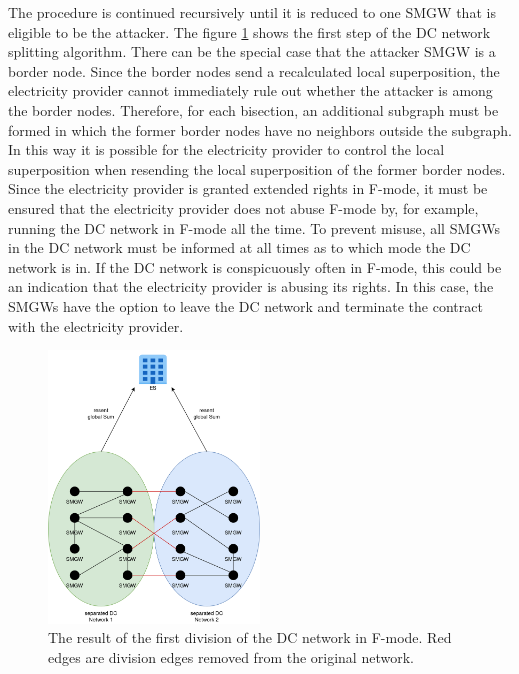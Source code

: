 The procedure is continued recursively until it is reduced to one \gls{SMGW} that is eligible to be the attacker. The figure \ref{fig:FirstSplitting} shows the first step of the DC network splitting algorithm.
There can be the special case that the attacker \gls{SMGW} is a border node. Since the border nodes send a recalculated local superposition, the electricity provider cannot immediately rule out whether the attacker is among the border nodes. Therefore, for each bisection, an additional subgraph must be formed in which the former border nodes have no neighbors outside the subgraph. In this way it is possible for the electricity provider to control the local superposition when resending the local superposition of the former border nodes. \\
Since the electricity provider is granted extended rights in F-mode, it must be ensured that the electricity provider does not abuse F-mode by, for example, running the DC network in F-mode all the time. To prevent misuse, all \gls{SMGW}s in the DC network must be informed at all times as to which mode the DC network is in. If the DC network is conspicuously often in F-mode, this could be an indication that the electricity provider is abusing its rights. In this case, the \gls{SMGW}s have the option to leave the DC network and terminate the contract with the electricity provider.
\begin{figure}[tbp]
  \centering
  \includegraphics[width=0.5\textwidth]{images/DC Net Split2.png}
  \caption[DC Network Splitting Algorithm]{The result of the first division of the DC network in F-mode. Red edges are division edges removed from the original network.}
  \label{fig:FirstSplitting}
\end{figure}

